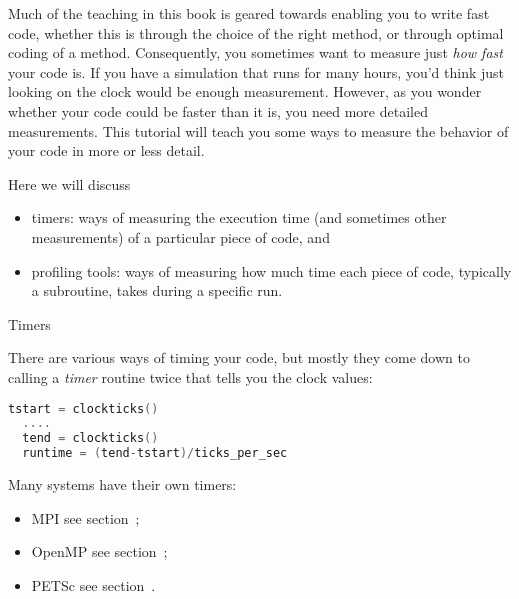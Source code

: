 
Much of the teaching in this book is geared towards enabling you to
write fast code, whether this is through the choice of the right
method, or through optimal coding of a method. Consequently, you
sometimes want to measure just \emph{how fast} your code is. If you
have a simulation that runs for many hours, you'd think just looking
on the clock would be enough measurement. However, as you wonder
whether your code could be faster than it is, you need more detailed
measurements. This tutorial will teach you some ways to measure the
behavior of your code in more or less detail.

Here we will discuss 
\begin{itemize}
\item timers: ways of measuring the execution time (and sometimes
  other measurements) of a particular piece of code, and
\item profiling tools: ways of measuring how much time each piece of
  code, typically a subroutine, takes during a specific run.
\end{itemize}

 {Timers}
\label{sec:perf-timers}

There are various ways of timing your code, but mostly they come down
to calling a \emph{timer} routine twice that tells you the clock values:
\begin{lstlisting}[language=c++]
  tstart = clockticks()
  ....
  tend = clockticks()
  runtime = (tend-tstart)/ticks_per_sec
\end{lstlisting}

Many systems have their own timers:
\begin{itemize}
\item MPI see section~;
\item OpenMP see section~;
\item PETSc see section~.
\end{itemize}

